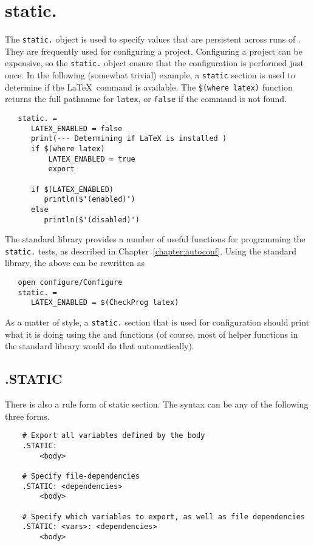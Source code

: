 \section{static.}
\label{section:static.}

The \verb+static.+ object is used to specify values that are persistent across runs of \OMake{}.  They
are frequently used for configuring a project.  Configuring a project can be expensive, so the
\verb+static.+ object ensure that the configuration is performed just once.  In the following
(somewhat trivial) example, a \verb+static+ section is used to determine if the \LaTeX\ command is
available.  The \verb+$(where latex)+ function returns the full pathname for \verb+latex+, or
\verb+false+ if the command is not found.

\begin{verbatim}
   static. =
      LATEX_ENABLED = false
      print(--- Determining if LaTeX is installed )
      if $(where latex)
          LATEX_ENABLED = true
          export

      if $(LATEX_ENABLED)
         println($'(enabled)')
      else
         println($'(disabled)')
\end{verbatim}

The \OMake standard library provides a number of useful functions for
programming the \verb+static.+ tests, as described in
Chapter~\ref{chapter:autoconf}. Using the standard library, the above can
be rewritten as

\begin{verbatim}
   open configure/Configure
   static. =
      LATEX_ENABLED = $(CheckProg latex)
\end{verbatim}

As a matter of style, a \verb+static.+ section that is used for configuration should print what it
is doing using the  and
 functions (of course, most of helper functions in
the standard library would do that automatically).

\subsection{.STATIC}
\label{section:.STATIC}

\newinreorg

There is also a rule form of static section.  The syntax can be any of the following three forms.

\begin{verbatim}
    # Export all variables defined by the body
    .STATIC:
        <body>

    # Specify file-dependencies
    .STATIC: <dependencies>
        <body>

    # Specify which variables to export, as well as file dependencies
    .STATIC: <vars>: <dependencies>
        <body>
\end{verbatim}

